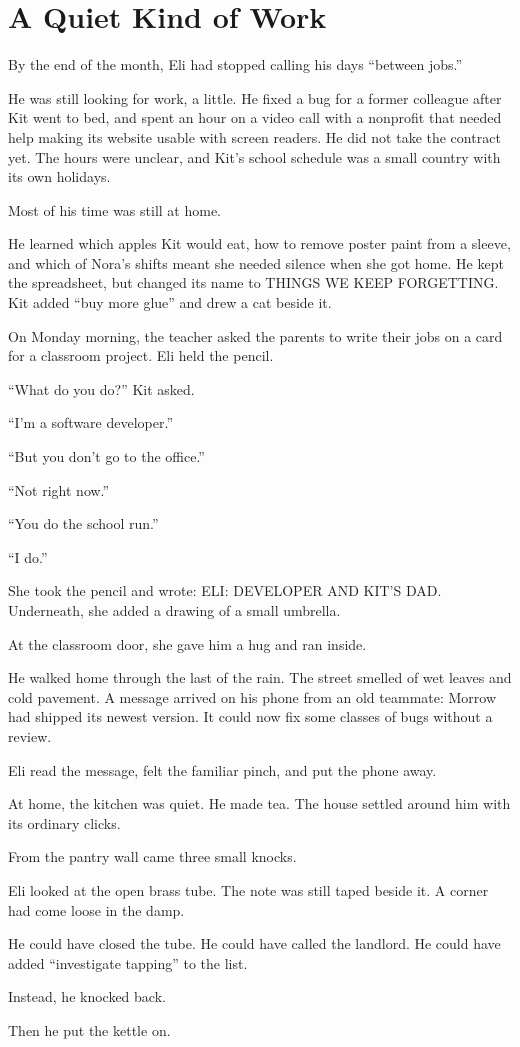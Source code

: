 \documentclass[11pt,openany]{book}
\begin{document}
\chapter{A Quiet Kind of Work}

By the end of the month, Eli had stopped calling his days ``between jobs.''

He was still looking for work, a little. He fixed a bug for a former colleague after Kit went to bed, and spent an hour on a video call with a nonprofit that needed help making its website usable with screen readers. He did not take the contract yet. The hours were unclear, and Kit's school schedule was a small country with its own holidays.

Most of his time was still at home.

He learned which apples Kit would eat, how to remove poster paint from a sleeve, and which of Nora's shifts meant she needed silence when she got home. He kept the spreadsheet, but changed its name to THINGS WE KEEP FORGETTING. Kit added ``buy more glue'' and drew a cat beside it.

On Monday morning, the teacher asked the parents to write their jobs on a card for a classroom project. Eli held the pencil.

``What do you do?'' Kit asked.

``I'm a software developer.''

``But you don't go to the office.''

``Not right now.''

``You do the school run.''

``I do.''

She took the pencil and wrote: ELI: DEVELOPER AND KIT'S DAD. Underneath, she added a drawing of a small umbrella.

At the classroom door, she gave him a hug and ran inside.

He walked home through the last of the rain. The street smelled of wet leaves and cold pavement. A message arrived on his phone from an old teammate: Morrow had shipped its newest version. It could now fix some classes of bugs without a review.

Eli read the message, felt the familiar pinch, and put the phone away.

At home, the kitchen was quiet. He made tea. The house settled around him with its ordinary clicks.

From the pantry wall came three small knocks.

Eli looked at the open brass tube. The note was still taped beside it. A corner had come loose in the damp.

He could have closed the tube. He could have called the landlord. He could have added ``investigate tapping'' to the list.

Instead, he knocked back.

Then he put the kettle on.
\end{document}
